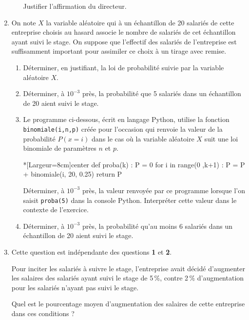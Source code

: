 \begin{enumerate}
\begin{enumerate}
		Justifier l’affirmation du directeur. 
	\end{enumerate}
	\item On note $X$ la variable aléatoire qui à un échantillon de 20 salariés de cette entreprise choisis au hasard associe le nombre de salariés de cet échantillon ayant suivi le stage. On suppose que l’effectif des salariés de l’entreprise est suffisamment important pour assimiler ce choix à un tirage avec remise.
	\begin{enumerate}
		\item Déterminer, en justifiant, la loi de probabilité suivie par la variable aléatoire $X$.
		\item Déterminer, à $10^{-3}$ près, la probabilité que 5 salariés dans un échantillon de 20 aient suivi le stage.
		\item Le programme ci-dessous, écrit en langage \textsf{Python}, utilise la fonction  \texttt{binomiale(i,n,p)} créée pour l’occasion qui renvoie la valeur de la probabilité $P(x=i)$ dans le cas où la variable aléatoire $X$ suit une loi binomiale de paramètres $n$ et $p$.

\begin{CodePythonLstAlt}*[Largeur=8cm]{center}
def proba(k) :
	P = 0
	for i in range(0 ,k+1) :
		P = P + binomiale(i, 20, 0.25)
	return P
\end{CodePythonLstAlt}

		Déterminer, à $10^{-3}$ près, la valeur renvoyée par ce programme lorsque l’on saisit \texttt{proba(5)} dans la console \textsf{Python}. Interpréter cette valeur dans le contexte de l’exercice.
		\item Déterminer, à $10^{-3}$ près, la probabilité qu’au moins 6 salariés dans un échantillon de 20 aient suivi le stage.
	\end{enumerate}
	\item Cette question est indépendante des questions \textbf{1} et \textbf{2}.
	
	Pour inciter les salariés à suivre le stage, l’entreprise avait décidé d’augmenter les salaires des salariés ayant suivi le stage de 5\,\%, contre 2\,\% d’augmentation pour les salariés n’ayant pas suivi le stage.
	
	Quel est le pourcentage moyen d’augmentation des salaires de cette entreprise dans ces conditions ?
\end{enumerate}

